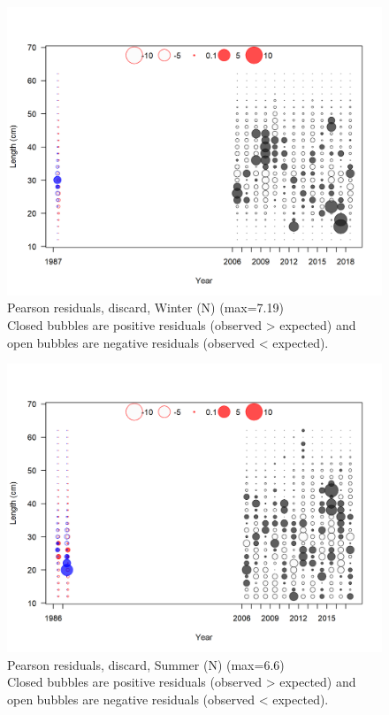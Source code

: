 \documentclass[12pt,]{article}
\begin{document}
\FloatBarrier

\begin{figure}
\centering
\includegraphics{r4ss/plots_mod1/comp_lenfit_residsflt1mkt1.png}
\caption{Pearson residuals, discard, Winter (N) (max=7.19)\\
Closed bubbles are positive residuals (observed \textgreater{} expected)
and open bubbles are negative residuals (observed \textless{} expected).
\label{fig:discard_wn_len_pearson}}
\end{figure}

\begin{figure}
\centering
\includegraphics{r4ss/plots_mod1/comp_lenfit_residsflt2mkt1.png}
\caption{Pearson residuals, discard, Summer (N) (max=6.6)\\
Closed bubbles are positive residuals (observed \textgreater{} expected)
and open bubbles are negative residuals (observed \textless{} expected).
\label{fig:discard_sn_len_pearson}}
\end{figure}
\end{document}
